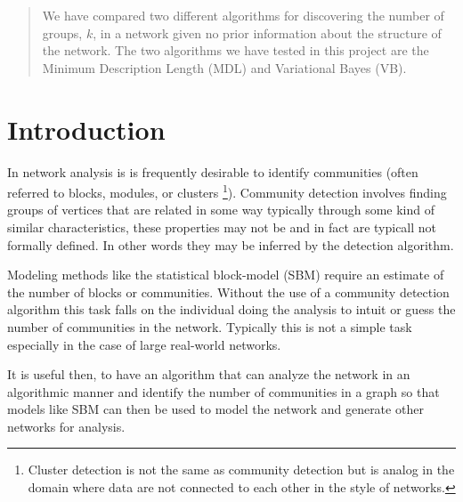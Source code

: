 \documentclass[twocolumn,twoside]{IEEEtran}
\author{Brett Israelsen \& Joshua Rahm}
\begin{document}
\maketitle

\begin{abstract}
We have compared two different algorithms for discovering
the number of groups, $k$, in a network given no prior information about the
structure of the network. The two algorithms we have tested in this project are
the Minimum Description Length (MDL) and Variational Bayes (VB).
\end{abstract}

\section*{Introduction}\label{sec:Intro} In network analysis is is frequently
desirable to identify communities (often referred to blocks, modules, or
clusters \footnote{Cluster detection is not the same as community detection but
is analog in the domain where data are not connected to each other in the style
of networks.}). Community detection involves finding groups of vertices that
are related in some way typically through some kind of similar characteristics,
these properties may not be and in fact are typicall not formally defined. In
other words they may be inferred by the detection algorithm.

Modeling methods like the statistical block-model (SBM) require an estimate of
the number of blocks or communities. Without the use of a community detection
algorithm this task falls on the individual doing the analysis to intuit or
guess the number of communities in the network. Typically this is not a simple
task especially in the case of large real-world networks.


It is useful then, to have an algorithm that can analyze the network in an
algorithmic manner and identify the number of communities in a graph so that
models like SBM can then be used to model the network and generate other
networks for analysis.
\end{document}
